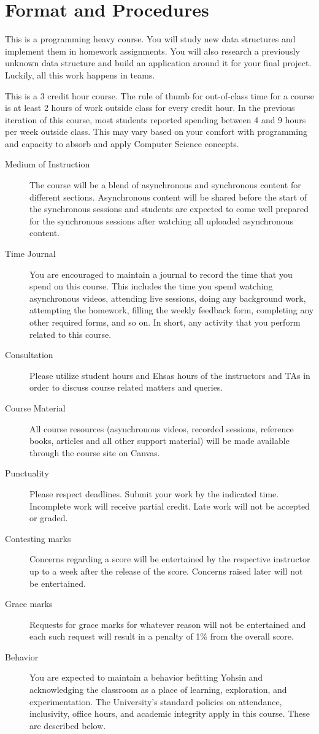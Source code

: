 \documentclass[a4paper]{article}
\begin{document}
\section{Format and Procedures}

This is a programming heavy course. You will study new data structures and implement them in homework assignments. You will also research a previously unknown data structure and build an application around it for your final project. Luckily, all this work happens in teams.

This is a 3 credit hour course. The rule of thumb for out-of-class time for a course is at least 2 hours of work outside class for every credit hour. In the previous iteration of this course, most students reported spending between 4 and 9 hours per week outside class. This may vary based on your comfort with programming and capacity to absorb and apply Computer Science concepts.

\begin{description}
\item[Medium of Instruction] The course will be a blend of asynchronous and synchronous content for different sections. Asynchronous content will be shared before the start of the synchronous sessions and students are expected to come well prepared for the synchronous sessions after watching all uploaded asynchronous content.
\item[Time Journal] You are encouraged to maintain a journal to record the time that you spend on this course. This includes the time you spend watching asynchronous videos, attending live sessions, doing any background work, attempting the homework, filling the weekly feedback form, completing any other required forms, and so on. In short, any activity that you perform related to this course. 
\item[Consultation] Please utilize student hours and Ehsas hours of the instructors and TAs in order to discuss course related matters and queries.
\item[Course Material] All course resources (asynchronous videos, recorded sessions, reference books, articles and all other support material) will be made available through the course site on Canvas.
\item[Punctuality] Please respect deadlines. Submit your work by the indicated time. Incomplete work will receive partial credit. Late work will not be accepted or graded. 
\item[Contesting marks] Concerns regarding a score will be entertained by the respective instructor up to a week after the release of the score. Concerns raised later will not be entertained. 
\item[Grace marks] Requests for grace marks for whatever reason will not be entertained and each such request will result in a penalty of 1\% from the overall score. 
\item[Behavior] You are expected to maintain a behavior befitting Yohsin and acknowledging the classroom as a place of learning, exploration, and experimentation. The University’s standard policies on attendance, inclusivity, office hours, and academic integrity apply in this course. These are described below. 
\end{description}
\end{document}
